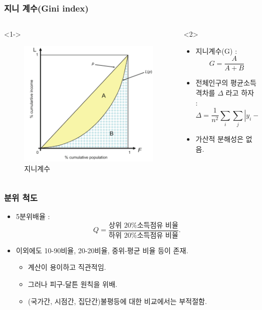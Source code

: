 \documentclass[aspectratio=169,xcolor=dvipsnames,]{beamer}
\begin{document}
\begin{frame}[<+->]
\frametitle{지니 계수(Gini index)}
    \begin{columns}
        \begin{column}{.5\textwidth}<1->
            \begin{figure}
                \centering
                \includegraphics[width=.78\textwidth]{pic/gini.png}
                \caption{지니계수}
            \end{figure}
        \end{column}
        \begin{column}{.5\textwidth}<2>
            \begin{itemize}
                \item 지니계수(G) :
                $$ G = \frac{A}{A+B}$$   
                \item 전체인구의 평균소득 격차를 $\Delta$ 라고 하자 : 
                $$ \Delta = \frac{1}{n^2}\sum _i \sum _j | y_i - y_j |, \quad G = \frac{\Delta}{2 \mu}.$$
                \item 가산적 분해성은 없음.
            \end{itemize}
        \end{column}
    \end{columns}
\end{frame}

\begin{frame}[<+->]
\frametitle{분위 척도}
    \begin{itemize}
        \item 5분위배율 :
        $$Q= \frac{ \text{상위 20\% 소득점유 비율} }{ \text{하위 20\% 소득점유 비율} }.$$
        \item 이외에도 10-90비율, 20-20비율, 중위-평균 비율 등이 존재.
            \begin{itemize}
                \item 계산이 용이하고 직관적임.
                \item 그러나 피구-달튼 원칙을 위배.
                \item (국가간, 시점간, 집단간)불평등에 대한 비교에서는 부적절함.
            \end{itemize}
    \end{itemize}
\end{frame}
\end{document}
